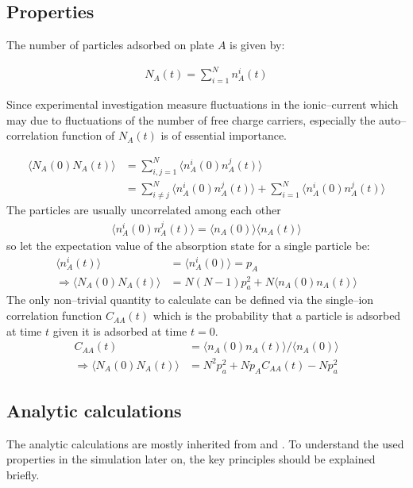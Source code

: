 \documentclass[a4paper, parskip=half]{scrartcl}
\newcommand{\myEqLabel}[1]{\label{eq:#1}}
\begin{document}
\subsection{Properties}
The number of particles adsorbed on plate $A$ is given by:

\begin{align}
N_A(t) = \sum_{i=1}^N n_A^i(t)
\end{align}

Since experimental investigation measure fluctuations in the ionic--current which may due to fluctuations of the number of free charge carriers, especially the auto--correlation function of $N_A(t)$ is of essential importance.

\begin{align}
\langle N_A(0) N_A(t)\rangle &= \sum_{i,j = 1}^N \langle n_A^i(0) n_A^j(t)\rangle\\
&= \sum_{i \neq j}^N \langle n_A^i(0) n_A^j(t)\rangle + \sum_{i =1}^N \langle n_A^i(0) n_A^j(t)\rangle
\end{align}
The particles are usually uncorrelated among each other 
\begin{align}
\langle n_A^i(0) n_A^j(t)\rangle = \langle n_A(0) \rangle\langle n_A(t) \rangle
\end{align}
so let the expectation value of the absorption state for a single particle be:
\begin{align}
\langle n_A^i(t) \rangle &= \langle n_A^i(0) \rangle = p_A \myEqLabel{p_A}\\
\Rightarrow \langle N_A(0) N_A(t)\rangle &= N(N-1)p_a^2 + N\langle n_A(0) n_A(t)\rangle
\end{align}
The only non--trivial quantity to calculate can be defined via the single--ion correlation function $C_{AA}(t)$ which is the probability that a particle is adsorbed at time $t$ given it is adsorbed at time $t=0$.
\begin{align}
C_{AA}(t) &= \langle n_A(0) n_A(t) \rangle / \langle n_A(0) \rangle \\
\Rightarrow \langle N_A(0) N_A(t)\rangle &= N^2p_a^2 + Np_AC_{AA}(t) - Np_a^2 \myEqLabel{N_A}
\end{align}
\subsection{Analytic calculations}
The analytic calculations are mostly inherited from \cite{netzpaper} and \cite{netzpaper2}. To understand the used properties in the simulation later on, the key principles should be explained briefly.
\end{document}
